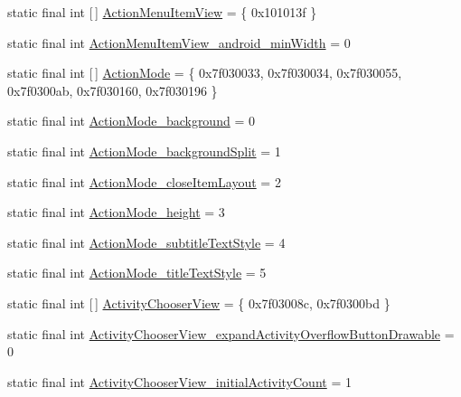 \begin{DoxyCompactItemize}
static final int \mbox{[}$\,$\mbox{]} \mbox{\hyperlink{classcom_1_1synnapps_1_1carouselview_1_1_r_1_1styleable_af0d2cc241fa4e96a38cded406e5d62ec}{Action\+Menu\+Item\+View}} = \{ 0x101013f \}
\item 
static final int \mbox{\hyperlink{classcom_1_1synnapps_1_1carouselview_1_1_r_1_1styleable_aa368322d1b4c986d89f3d2ec4e4dd045}{Action\+Menu\+Item\+View\+\_\+android\+\_\+min\+Width}} = 0
\item 
static final int \mbox{[}$\,$\mbox{]} \mbox{\hyperlink{classcom_1_1synnapps_1_1carouselview_1_1_r_1_1styleable_accfc47a6653399dfdd93b47eeb7d8d06}{Action\+Mode}} = \{ 0x7f030033, 0x7f030034, 0x7f030055, 0x7f0300ab, 0x7f030160, 0x7f030196 \}
\item 
static final int \mbox{\hyperlink{classcom_1_1synnapps_1_1carouselview_1_1_r_1_1styleable_af39bc99a3d42d6b70cb8562707702782}{Action\+Mode\+\_\+background}} = 0
\item 
static final int \mbox{\hyperlink{classcom_1_1synnapps_1_1carouselview_1_1_r_1_1styleable_a1865ee5fb491125252f5fcf71d90af15}{Action\+Mode\+\_\+background\+Split}} = 1
\item 
static final int \mbox{\hyperlink{classcom_1_1synnapps_1_1carouselview_1_1_r_1_1styleable_aca7f571d0944bbca0b07df289b89963a}{Action\+Mode\+\_\+close\+Item\+Layout}} = 2
\item 
static final int \mbox{\hyperlink{classcom_1_1synnapps_1_1carouselview_1_1_r_1_1styleable_aa07422285c521d5c65131f4a30ce3637}{Action\+Mode\+\_\+height}} = 3
\item 
static final int \mbox{\hyperlink{classcom_1_1synnapps_1_1carouselview_1_1_r_1_1styleable_a0d7c5610c09e7fa2d516ca5d8c13220f}{Action\+Mode\+\_\+subtitle\+Text\+Style}} = 4
\item 
static final int \mbox{\hyperlink{classcom_1_1synnapps_1_1carouselview_1_1_r_1_1styleable_a2e6d38082a10f5ff8dc2b649fcb64b63}{Action\+Mode\+\_\+title\+Text\+Style}} = 5
\item 
static final int \mbox{[}$\,$\mbox{]} \mbox{\hyperlink{classcom_1_1synnapps_1_1carouselview_1_1_r_1_1styleable_a841eb63db3643012d75954104e4a1f61}{Activity\+Chooser\+View}} = \{ 0x7f03008c, 0x7f0300bd \}
\item 
static final int \mbox{\hyperlink{classcom_1_1synnapps_1_1carouselview_1_1_r_1_1styleable_a8e2cf881bde0be337ce9155a82eee1a1}{Activity\+Chooser\+View\+\_\+expand\+Activity\+Overflow\+Button\+Drawable}} = 0
\item 
static final int \mbox{\hyperlink{classcom_1_1synnapps_1_1carouselview_1_1_r_1_1styleable_a00519578582a3be53435295047d45150}{Activity\+Chooser\+View\+\_\+initial\+Activity\+Count}} = 1

\end{DoxyCompactItemize}
